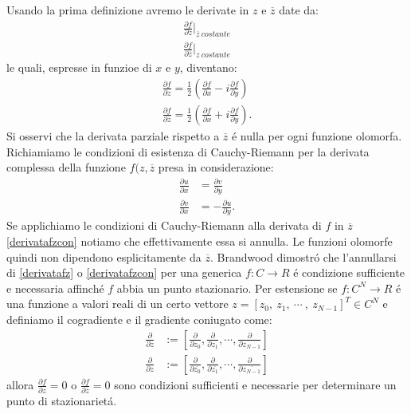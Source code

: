 \documentclass[a4paper,10pt]{article}
\begin{document}
 Usando la prima definizione avremo le derivate in $z$ e $\overline{z}$ date da:
 \begin{align}
  \frac{\partial f}{\partial z}\bigg|_{\overline{z} \ costante}\\
  \frac{\partial f}{\partial \overline{z}}\bigg|_{z \ costante}
 \end{align}
 le quali, espresse in funzioe di $x$ e $y$, diventano:
 \begin{align}
  \frac{\partial f}{\partial z} = \frac{1}{2}\left(\frac{\partial f}{\partial x}-i\frac{\partial f}{\partial y}\right)\label{derivatafz}\\
  \frac{\partial f}{\partial \overline{z}} = \frac{1}{2}\left(\frac{\partial f}{\partial x}+i\frac{\partial f}{\partial y}\right).\label{derivatafzcon}
 \end{align}
 Si osservi che la derivata parziale rispetto a $\overline{z}$ \'e nulla per ogni funzione olomorfa. Richiamiamo le condizioni di esistenza di Cauchy-Riemann per la derivata complessa della funzione $f(z,\overline{z}$ presa in considerazione:
 \begin{align}
  \frac{\partial u}{\partial x} &= \frac{\partial v}{\partial y}\\
  \frac{\partial v}{\partial x} &=- \frac{\partial u}{\partial y}.
 \end{align}
 Se applichiamo le condizioni di Cauchy-Riemann alla derivata di $f$ in $\overline{z}$ \ref{derivatafzcon} notiamo che effettivamente essa si annulla. Le funzioni olomorfe quindi non dipendono esplicitamente da $\overline{z}$. Brandwood dimostr\'o che l'annullarsi di \ref{derivatafz} o \ref{derivatafzcon} per una generica $f:C\rightarrow R$ \'e condizione sufficiente e necessaria affinch\'e $f$ abbia un punto stazionario. Per estensione se $f:C^N\rightarrow R$ \'e una funzione a valori reali di un certo vettore $z=\left[ z_0, \ z_1, \ \cdots \ , \ z_{N-1}\right]^T \in C^N$ e definiamo il cogradiente e il gradiente coniugato come:
 \begin{align}
  \frac{\partial}{\partial z} &:=\left[ \frac{\partial}{\partial z_0},\frac{\partial}{\partial z_1},\cdots ,\frac{\partial}{\partial z_{N-1}}\right]\\
  \frac{\partial}{\partial z} &:=\left[ \frac{\partial}{\partial \overline{z_0}},\frac{\partial}{\partial \overline{z_1}},\cdots ,\frac{\partial}{\partial \overline{z_{N-1}}}\right]
 \end{align}
 allora $\frac{\partial f}{\partial z}=0$ o $\frac{\partial f}{\partial \overline{z}}=0$ sono condizioni sufficienti e necessarie per determinare un punto di stazionariet\'a. 
\end{document}
